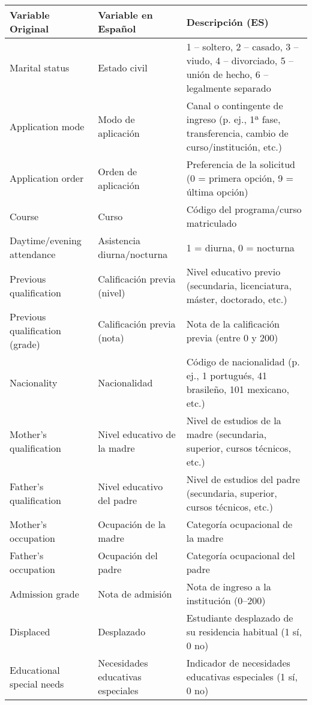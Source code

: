 \begin{table}[H]
\centering
\small
\begin{tabular}{|p{5cm}|p{5cm}|p{6cm}|}
\hline
\textbf{Variable Original} & \textbf{Variable en Español} & \textbf{Descripción (ES)}\\ \hline
Marital status & Estado civil & 1 – soltero, 2 – casado, 3 – viudo, 4 – divorciado, 5 – unión de hecho, 6 – legalmente separado \\ \hline
Application mode & Modo de aplicación & Canal o contingente de ingreso (p. ej., 1ª fase, transferencia, cambio de curso/institución, etc.) \\ \hline
Application order & Orden de aplicación & Preferencia de la solicitud (0 = primera opción, 9 = última opción) \\ \hline
Course & Curso & Código del programa/curso matriculado \\ \hline
Daytime/evening attendance & Asistencia diurna/nocturna & 1 = diurna, 0 = nocturna \\ \hline
Previous qualification & Calificación previa (nivel) & Nivel educativo previo (secundaria, licenciatura, máster, doctorado, etc.) \\ \hline
Previous qualification (grade) & Calificación previa (nota) & Nota de la calificación previa (entre 0 y 200) \\ \hline
Nacionality & Nacionalidad & Código de nacionalidad (p. ej., 1 portugués, 41 brasileño, 101 mexicano, etc.) \\ \hline
Mother's qualification & Nivel educativo de la madre & Nivel de estudios de la madre (secundaria, superior, cursos técnicos, etc.) \\ \hline
Father's qualification & Nivel educativo del padre & Nivel de estudios del padre (secundaria, superior, cursos técnicos, etc.) \\ \hline
Mother's occupation & Ocupación de la madre & Categoría ocupacional de la madre \\ \hline
Father's occupation & Ocupación del padre & Categoría ocupacional del padre \\ \hline
Admission grade & Nota de admisión & Nota de ingreso a la institución (0–200) \\ \hline
Displaced & Desplazado & Estudiante desplazado de su residencia habitual (1 sí, 0 no) \\ \hline
Educational special needs & Necesidades educativas especiales & Indicador de necesidades educativas especiales (1 sí, 0 no) \\ \hline

\end{tabular}
\end{table}
